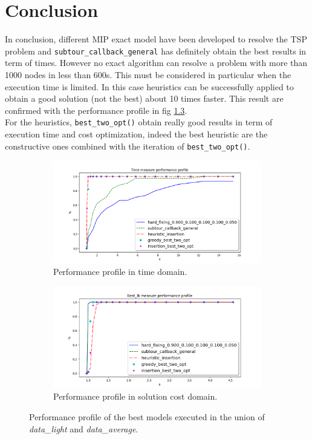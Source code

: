 \chapter{Conclusion}
In conclusion, different MIP exact model have been developed to resolve the TSP problem and \texttt{subtour\_callback\_general} has definitely obtain the best results in term of times. However no exact algorithm can resolve a problem with more than 1000 nodes in less than 600s. This must be considered in particular when the execution time is limited. In this case heuristics can be successfully applied to obtain a good solution (not the best) about 10 times faster. This result are confirmed with the performance profile in fig \ref{fig:pp_Lbest}.\\
For the heuristics, \texttt{best\_two\_opt()} obtain really good results in term of execution time and cost optimization, indeed the best heuristic are the constructive ones combined with the iteration of \texttt{best\_two\_opt()}.
\begin{figure}[!h]
	\centering
	\begin{subfigure}{.9\textwidth}
		\centering
		\includegraphics[width=\columnwidth]{../res/Lbest_time.png}
		\caption{Performance profile in time domain.}
		\label{fig:Lbest_time}
	\end{subfigure}
	\begin{subfigure}{.9\textwidth}
		\centering
		\includegraphics[width=\columnwidth]{../res/Lbest_lb.png}
		\caption{Performance profile in solution cost domain.}
		\label{fig:Lbest_lb}
	\end{subfigure}
	\caption{Performance profile of the best models executed in the union of \textit{data\_light} and \textit{data\_average}.}
	\label{fig:pp_Lbest}
\end{figure}